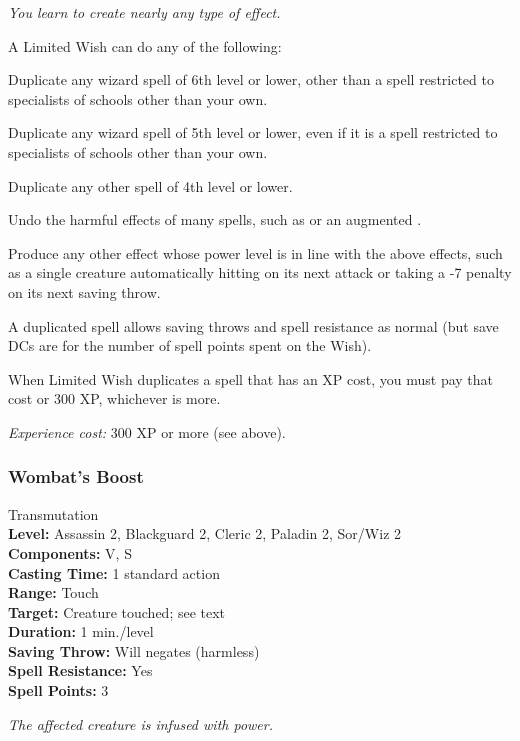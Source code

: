 \emph{You learn to create nearly any type of effect.}

A Limited Wish can do any of the following:
\begin{list}{}{\leftmargin=1em}
\item Duplicate any wizard spell of 6th level or lower, other than a spell restricted to specialists of schools other than your own.
\item Duplicate any wizard spell of 5th level or lower,  even if it is a spell restricted to specialists of schools other than your own.
\item Duplicate any other spell of 4th level or lower.
\item Undo the harmful effects of many spells, such as  or an augmented .
\item Produce any other effect whose power level is in line with the above effects, 
such as a single creature automatically hitting on its next attack or taking a -7 penalty on its next saving throw.
\end{list}
A duplicated spell allows saving throws and spell resistance as normal (but save DCs are for the number of spell points spent on the Wish).

When Limited Wish duplicates a spell that has an XP cost, you must pay that cost or 300 XP, whichever is more. 

\emph{Experience cost:} 300 XP or more (see above).
\subsubsection{Wombat's Boost}
\label{Spell:WombatsBoost}
Transmutation
\\ \textbf{Level:} Assassin 2, Blackguard 2, Cleric 2, Paladin 2, Sor/Wiz 2
\\ \textbf{Components:} V, S
\\ \textbf{Casting Time:} 1 standard action
\\ \textbf{Range:} Touch
\\ \textbf{Target:} Creature touched; see text
\\ \textbf{Duration:} 1 min./level
\\ \textbf{Saving Throw:} Will negates (harmless)
\\ \textbf{Spell Resistance:} Yes
\\ \textbf{Spell Points:} 3

\emph{The affected creature is infused with power.} 

